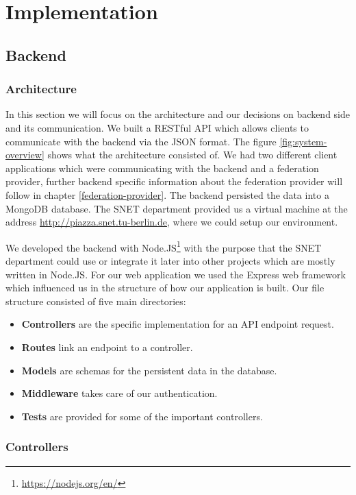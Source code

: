 \chapter{Implementation}
\label{cha:implementation}


\section{Backend}

\subsection{Architecture}

In this section we will focus on the architecture and our decisions on backend side and its communication. We built a RESTful API which allows clients to communicate with the backend via the JSON format. The figure \ref{fig:system-overview} shows what the architecture consisted of. We had two different client applications which were communicating with the backend and a federation provider, further backend specific information about the federation provider will follow in chapter \ref{federation-provider}. The backend persisted the data into a MongoDB database. The SNET department provided us a virtual machine at the address \url{http://piazza.snet.tu-berlin.de}, where we could setup our environment.

We developed the backend with Node.JS\footnote{\url{https://nodejs.org/en/}} with the purpose that the SNET department could use or integrate it later into other projects which are mostly written in Node.JS. For our web application we used the Express web framework which influenced us in the structure of how our application is built. Our file structure consisted of five main directories:
\begin{itemize}
  \item \textbf{Controllers} are the specific implementation for an API endpoint request.
  \item \textbf{Routes} link an endpoint to a controller.
  \item \textbf{Models} are schemas for the persistent data in the database.
  \item \textbf{Middleware} takes care of our authentication.
  \item \textbf{Tests} are provided for some of the important controllers.
\end{itemize}

\subsection{Controllers}

